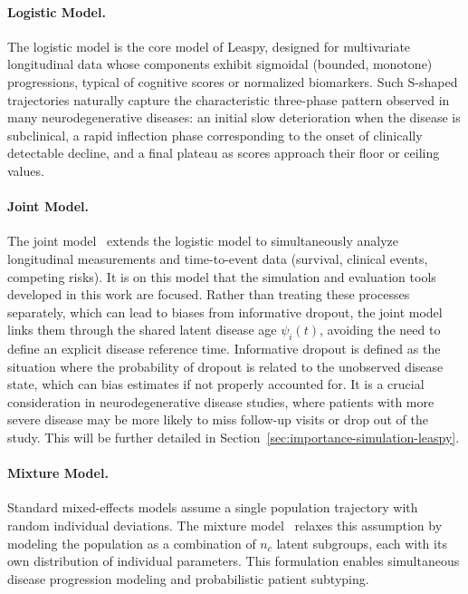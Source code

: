 \documentclass{rapportCS}
\begin{document}
\paragraph{Logistic Model.} The logistic model is the core model of Leaspy, designed for multivariate longitudinal data whose components exhibit sigmoidal (bounded, monotone) progressions, typical of cognitive scores or normalized biomarkers. Such S-shaped trajectories naturally capture the characteristic three-phase pattern observed in many neurodegenerative diseases: an initial slow deterioration when the disease is subclinical, a rapid inflection phase corresponding to the onset of clinically detectable decline, and a final plateau as scores approach their floor or ceiling values. 

\paragraph{Joint Model.} The joint model~\cite{ortholand2025multijoint, ortholand2026joint} extends the logistic model to simultaneously analyze longitudinal measurements and time-to-event data (survival, clinical events, competing risks). It is on this model that the simulation and evaluation tools developed in this work are focused. Rather than treating these processes separately, which can lead to biases from informative dropout, the joint model links them through the shared latent disease age $\psi_i(t)$, avoiding the need to define an explicit disease reference time. Informative dropout is defined as the situation where the probability of dropout is related to the unobserved disease state, which can bias estimates if not properly accounted for. It is a crucial consideration in neurodegenerative disease studies, where patients with more severe disease may be more likely to miss follow-up visits or drop out of the study. This will be further detailed in Section~\ref{sec:importance-simulation-leaspy}. 

\paragraph{Mixture Model.} Standard mixed-effects models assume a single population trajectory with random individual deviations. The mixture model~\cite{kaisaridi2025mixture} relaxes this assumption by modeling the population as a combination of $n_c$ latent subgroups, each with its own distribution of individual parameters. This formulation enables simultaneous disease progression modeling and probabilistic patient subtyping.
\end{document}
